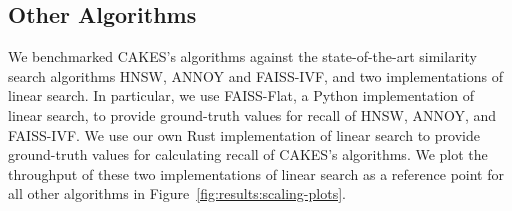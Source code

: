\subsection{Other Algorithms}
\label{sec:datasets-and-benchmarks:other-algorithms}

We benchmarked CAKES's algorithms against the state-of-the-art similarity search algorithms HNSW, ANNOY and FAISS-IVF, and two implementations of linear search.
In particular, we use FAISS-Flat, a Python implementation of linear search, to provide ground-truth values for recall of HNSW, ANNOY, and FAISS-IVF.
We use our own Rust implementation of linear search to provide ground-truth values for calculating recall of CAKES's algorithms.
We plot the throughput of these two implementations of linear search as a reference point for all other algorithms in Figure~\ref{fig:results:scaling-plots}.
